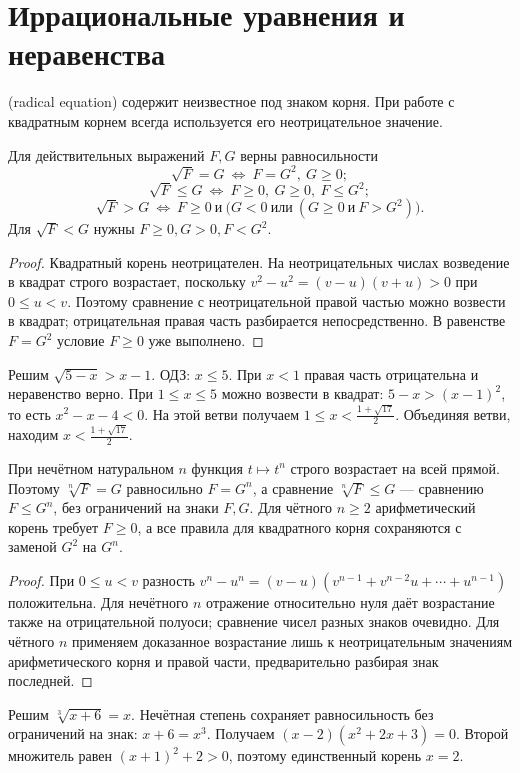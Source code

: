 \section{Иррациональные уравнения и неравенства}
\begin{definition} (radical equation) содержит неизвестное под знаком корня. При работе с квадратным корнем всегда используется его неотрицательное значение.\end{definition}
\begin{theorem}
Для действительных выражений \(F,G\) верны равносильности
\[
\sqrt F=G\ \Longleftrightarrow\ F=G^2,\ G\geq0;
\]
\[
\sqrt F\leq G\ \Longleftrightarrow\ F\geq0,\ G\geq0,\ F\leq G^2;
\]
\[
\sqrt F>G\ \Longleftrightarrow\ F\geq0\ \text{и}\
\bigl(G<0\ \text{или}\ (G\geq0\ \text{и}\ F>G^2)\bigr).
\]
Для \(\sqrt F<G\) нужны \(F\geq0,G>0,F<G^2\).
\end{theorem}
\begin{proof}Квадратный корень неотрицателен. На неотрицательных числах возведение в квадрат строго возрастает, поскольку \(v^2-u^2=(v-u)(v+u)>0\) при \(0\leq u<v\). Поэтому сравнение с неотрицательной правой частью можно возвести в квадрат; отрицательная правая часть разбирается непосредственно. В равенстве \(F=G^2\) условие \(F\geq0\) уже выполнено.\end{proof}
\begin{example}Решим \(\sqrt{5-x}>x-1\). ОДЗ: \(x\leq5\). При \(x<1\) правая часть отрицательна и неравенство верно. При \(1\leq x\leq5\) можно возвести в квадрат: \(5-x>(x-1)^2\), то есть \(x^2-x-4<0\). На этой ветви получаем \(1\leq x<\frac{1+\sqrt{17}}2\). Объединяя ветви, находим \(x<\frac{1+\sqrt{17}}2\).\end{example}

\begin{theorem}
При нечётном натуральном \(n\) функция \(t\mapsto t^n\) строго возрастает на всей прямой. Поэтому \(\sqrt[n]{F}=G\) равносильно \(F=G^n\), а сравнение \(\sqrt[n]{F}\leq G\) — сравнению \(F\leq G^n\), без ограничений на знаки \(F,G\). Для чётного \(n\geq2\) арифметический корень требует \(F\geq0\), а все правила для квадратного корня сохраняются с заменой \(G^2\) на \(G^n\).
\end{theorem}
\begin{proof}При \(0\leq u<v\) разность \(v^n-u^n=(v-u)(v^{n-1}+v^{n-2}u+\cdots+u^{n-1})\) положительна. Для нечётного \(n\) отражение относительно нуля даёт возрастание также на отрицательной полуоси; сравнение чисел разных знаков очевидно. Для чётного \(n\) применяем доказанное возрастание лишь к неотрицательным значениям арифметического корня и правой части, предварительно разбирая знак последней.\end{proof}
\begin{example}Решим \(\sqrt[3]{x+6}=x\). Нечётная степень сохраняет равносильность без ограничений на знак: \(x+6=x^3\). Получаем \((x-2)(x^2+2x+3)=0\). Второй множитель равен \((x+1)^2+2>0\), поэтому единственный корень \(x=2\).\end{example}

